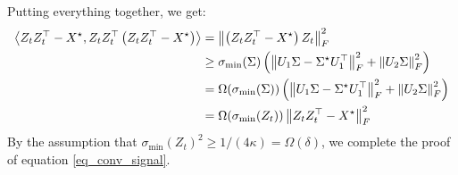 Putting everything together, we get:
\begin{align*}
 \left\langle {Z}_t {Z}_t^{\top } - {X}^\star , {Z}_t {Z}_t^{\top} \left({Z}_t {Z}_t^{\top } - {X}^\star \right)\right\rangle & = \left\|\left( {Z}_t {Z}_t^{\top } - {X}^\star \right) {Z}_t\right\|_F^2
 \\
& \geq \sigma_{\min} ({\Sigma}) \left( \left\|U_1 \Sigma - {{\Sigma}^\star} U_1^{\top}\right\|_F^2  + \left\| U_2 \Sigma\right\|_F^2\right)
\\
& = \Omega (\sigma_{\min} ({\Sigma}))  \left(  \left\|U_1 \Sigma  - {{\Sigma}^\star} U_1^{\top} \right\|_F^2  + \left\|U_2 \Sigma\right\|_F^2
 \right)
 \\
 & = \Omega (\sigma_{\min} ({Z}_t))  \left\|{Z}_t {Z}_t^{\top } - {X}^\star \right\|_F^2
 \end{align*}
By the assumption that $\sigma_{\min}(Z_t)^2 \geq 1/(4 { \kappa}) = \Omega(\delta)$, we complete the proof of equation \eqref{eq_conv_signal}.

